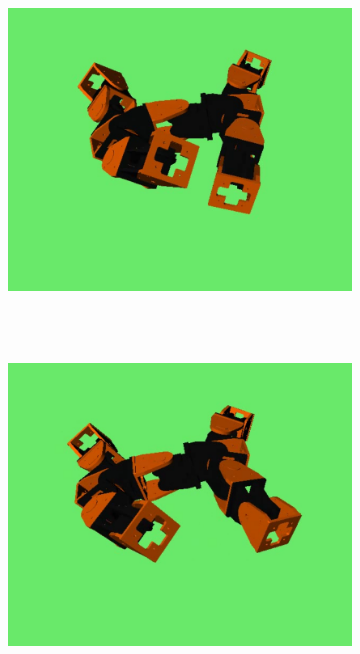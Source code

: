 \begin{figure}[h]
\begin{subfigure}[b]{0.25\textwidth}
                 \\~
        \end{subfigure}
        ~
        \begin{subfigure}[b]{0.25\textwidth}
         	   \centering
                \includegraphics[width=\textwidth]{images/results_11_gait_05.png}
                 \\~
        \end{subfigure}
        ~
                \begin{subfigure}[b]{0.25\textwidth}
                \centering
                \includegraphics[width=\textwidth]{images/results_11_gait_06.png}

\end{subfigure}
\end{figure}
